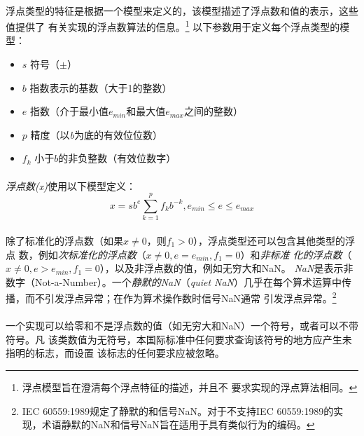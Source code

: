 
\paragraph{}
浮点类型的特征是根据一个模型来定义的，该模型描述了浮点数和值的表示，这些值提供了
有关实现的浮点数算法的信息。\footnote{浮点模型旨在澄清每个浮点特征的描述，并且不
要求实现的浮点算法相同。} 以下参数用于定义每个浮点类型的模型：
\begin{itemize}
  \item[]{$s$   \qquad 符号（$\pm$）}
  \item[]{$b$   \qquad 指数表示的基数（大于1的整数）}
  \item[]{$e$   \qquad 指数（介于最小值$e_{min}$和最大值$e_{max}$之间的整数）}
  \item[]{$p$   \qquad 精度（以\textit{b}为底的有效位位数）}
  \item[]{$f_k$ \qquad 小于$b$的非负整数（有效位数字）}
\end{itemize}

\paragraph{}
\textit{浮点数(x)}使用以下模型定义：
\begin{equation*}
  x = sb^e\sum_{k=1}^p f_k b^{-k}, e_{min} \le e \le e_{max}
\end{equation*}

\paragraph{}
除了标准化的浮点数（如果$x\neq0$，则$f_1>0$），浮点类型还可以包含其他类型的浮点
数，例如\textit{次标准化的浮点数}（$x\neq0,e=e_{min},f_1=0$）和\textit{非标准
化的浮点数}（$x\neq0,e>e_{min},f_1=0$），以及非浮点数的值，例如无穷大和NaN。
\textit{NaN}是表示非数字（Not-a-Number）。一个\textit{静默的NaN}（\textit{quiet
NaN}）几乎在每个算术运算中传播，而不引发浮点异常；在作为算术操作数时信号NaN通常
引发浮点异常。\footnote{IEC 60559:1989规定了静默的和信号NaN。对于不支持IEC
60559:1989的实现，术语静默的NaN和信号NaN旨在适用于具有类似行为的编码。}

\paragraph{}
一个实现可以给零和不是浮点数的值（如无穷大和NaN）一个符号，或者可以不带符号。凡
该类数值为无符号，本国际标准中任何要求查询该符号的地方应产生未指明的标志，而设置
该标志的任何要求应被忽略。

